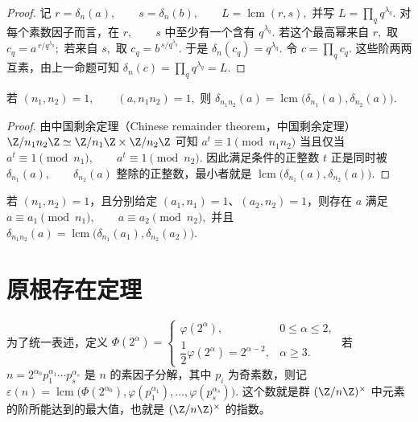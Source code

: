 \begin{proof}
记
\(
  r=\delta_n(a),\qquad s=\delta_n(b),\qquad L=\operatorname{lcm}(r,s),
\)
并写
\(
  L=\prod_q q^{\lambda_q}.
\)
对每个素数因子而言，在
\(
  r,\qquad s
\)
中至少有一个含有
\(
  q^{\lambda_q}.
\)
若这个最高幂来自
\(
  r,
\)
取
\(
  c_q=a^{\,r/q^{\lambda_q}};
\)
若来自
\(
  s,
\)
取
\(
  c_q=b^{\,s/q^{\lambda_q}}.
\)
于是
\(
  \delta_n(c_q)=q^{\lambda_q}.
\)
令
\(
  c=\prod_q c_q.
\)
这些阶两两互素，由上一命题可知
\(
  \delta_n(c)=\prod_q q^{\lambda_q}=L.
\)
\end{proof}

\begin{proposition}[中国剩余定理下的阶]
若
\(
  (n_1,n_2)=1,\qquad (a,n_1n_2)=1,
\)
则
\(
  \delta_{n_1n_2}(a)
  =
  \operatorname{lcm}\bigl(\delta_{n_1}(a),\delta_{n_2}(a)\bigr).
\)
\end{proposition}

\begin{proof}
由中国剩余定理（Chinese remainder theorem，中国剩余定理）
\(
  \Z/n_1n_2\Z\simeq \Z/n_1\Z\times \Z/n_2\Z
\)
可知
\(
  a^t\equiv 1\pmod {n_1n_2}
\)
当且仅当
\(
  a^t\equiv 1\pmod {n_1},\qquad
  a^t\equiv 1\pmod {n_2}.
\)
因此满足条件的正整数
\(
  t
\)
正是同时被
\(
  \delta_{n_1}(a),\qquad \delta_{n_2}(a)
\)
整除的正整数，最小者就是
\(
  \operatorname{lcm}\bigl(\delta_{n_1}(a),\delta_{n_2}(a)\bigr).
\)
\end{proof}

\begin{corollary}
若 $(n_1,n_2)=1$，且分别给定 $(a_1,n_1)=1$、$(a_2,n_2)=1$，则存在 $a$ 满足
\(
  a\equiv a_1\pmod {n_1},\qquad
  a\equiv a_2\pmod {n_2},
\)
并且
\(
  \delta_{n_1n_2}(a)
  =
  \operatorname{lcm}\bigl(\delta_{n_1}(a_1),\delta_{n_2}(a_2)\bigr).
\)
\end{corollary}

\section{原根存在定理}

为了统一表述，定义
\(
  \Phi(2^\alpha)=
  \begin{cases}
    \varphi(2^\alpha), & 0\le \alpha\le 2,\\
    \dfrac12\varphi(2^\alpha)=2^{\alpha-2}, & \alpha\ge 3.
  \end{cases}
\)
若
\(
  n=2^{\alpha_0}p_1^{\alpha_1}\cdots p_s^{\alpha_s}
\)
是 $n$ 的素因子分解，其中 $p_i$ 为奇素数，则记
\(
  \varepsilon(n)
  =
  \operatorname{lcm}\bigl(\Phi(2^{\alpha_0}),
  \varphi(p_1^{\alpha_1}),\ldots,\varphi(p_s^{\alpha_s})\bigr).
\)
这个数就是群 $\U n$ 中元素的阶所能达到的最大值，也就是 $\U n$ 的指数。

